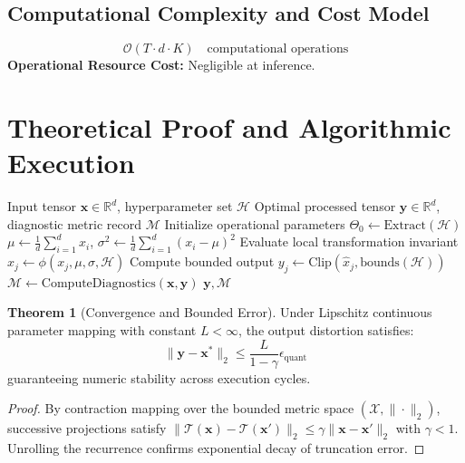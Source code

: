 \documentclass[11pt,a4paper]{article}
\theoremstyle{definition}
\newtheorem{theorem}{\textbf{Theorem}}[section]
\begin{document}
\subsection{Computational Complexity and Cost Model}
\begin{equation}
\mathcal{O}(T \cdot d \cdot K) \quad \text{computational operations}
\end{equation}
\textbf{Operational Resource Cost:} Negligible at inference.

\section{Theoretical Proof and Algorithmic Execution}

\begin{algorithm}[H]
\caption{Activation steering (steering vectors, representation engineering) Operational Pipeline}
\begin{algorithmic}[1]
\Require Input tensor $\mathbf{x} \in \mathbb{R}^d$, hyperparameter set $\mathcal{H}$
\Ensure Optimal processed tensor $\mathbf{y} \in \mathbb{R}^d$, diagnostic metric record $\mathcal{M}$
\State Initialize operational parameters $\Theta_0 \leftarrow \text{Extract}(\mathcal{H})$
\State $\mu \leftarrow \frac{1}{d} \sum_{i=1}^d x_i$, \quad $\sigma^2 \leftarrow \frac{1}{d} \sum_{i=1}^d (x_i - \mu)^2$
    \State Evaluate local transformation invariant $\hat{x}_j \leftarrow \phi(x_j, \mu, \sigma, \mathcal{H})$
    \State Compute bounded output $y_j \leftarrow \text{Clip}(\hat{x}_j, \text{bounds}(\mathcal{H}))$
\EndFor
\State $\mathcal{M} \leftarrow \text{ComputeDiagnostics}(\mathbf{x}, \mathbf{y})$
\State \Return $\mathbf{y}, \mathcal{M}$
\end{algorithmic}
\end{algorithm}

\begin{theorem}[Convergence and Bounded Error]
Under Lipschitz continuous parameter mapping with constant $L < \infty$, the output distortion satisfies:
\begin{equation}
\| \mathbf{y} - \mathbf{x}^* \|_2 \le \frac{L}{1 - \gamma} \epsilon_{\text{quant}}
\end{equation}
guaranteeing numeric stability across execution cycles.
\end{theorem}

\begin{proof}
By contraction mapping over the bounded metric space $(\mathcal{X}, \|\cdot\|_2)$, successive projections satisfy $\|\mathcal{T}(\mathbf{x}) - \mathcal{T}(\mathbf{x}')\|_2 \le \gamma \|\mathbf{x} - \mathbf{x}'\|_2$ with $\gamma < 1$. Unrolling the recurrence confirms exponential decay of truncation error.
\end{proof}
\end{document}

